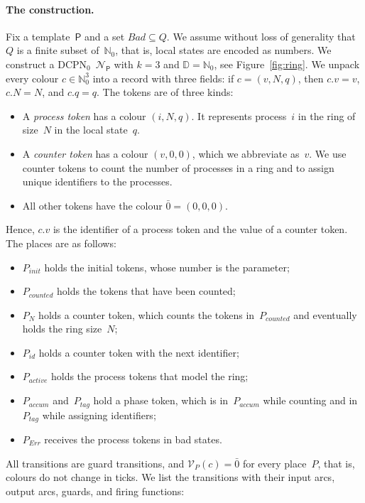 \documentclass[11pt]{article}
\theoremstyle{definition}
\newcommand{\NatZero}{\mathbb{N}_0}
\newcommand{\Dom}{\mathbb{D}}
\newcommand{\DCPN}[1]{\texorpdfstring{\textup{DCPN}\ensuremath{_{#1}}}{DCPN#1}}
\begin{document}
\paragraph{The construction.}
Fix a template~$\mathsf{P}$ and a set $\mathit{Bad} \subseteq Q$. We assume
without loss of generality that $Q$ is a finite subset of~$\NatZero$,
that is, local states are encoded as numbers.
We construct a \DCPN{0}~$\mathcal{N}_{\mathsf{P}}$
with $k = 3$ and $\Dom = \NatZero$, see Figure~\ref{fig:ring}. We unpack every
colour $c \in \NatZero^3$ into a record with three fields: if $c = (v, N, q)$,
then $c.v = v$, $c.N = N$, and $c.q = q$. The tokens are of three kinds:
\begin{itemize}
  \item A \emph{process token} has a colour $(i, N, q)$. It represents
    process~$i$ in the ring of size~$N$ in the local state~$q$.
  \item A \emph{counter token} has a colour $(v, 0, 0)$, which we abbreviate
    as~$v$. We use counter tokens to count the number of processes in a ring
    and to assign unique identifiers to the processes.
  \item All other tokens have the colour $\bar{0} = (0, 0, 0)$.
\end{itemize}
Hence, $c.v$ is the identifier of a process token and the value of a counter
token. The places are as follows:
\begin{itemize}
  \item $P_{\mathit{init}}$ holds the initial tokens, whose number is the
    parameter;
  \item $P_{\mathit{counted}}$ holds the tokens that have been counted;
  \item $P_N$ holds a counter token, which counts the tokens in~$P_{\mathit{counted}}$ and
    eventually holds the ring size~$N$;
  \item $P_{\mathit{id}}$ holds a counter token with the next identifier;
  \item $P_{\mathit{active}}$ holds the process tokens that model the ring;
  \item $P_{\mathit{accum}}$ and~$P_{\mathit{tag}}$ hold a phase token, which
    is in~$P_{\mathit{accum}}$ while counting and in~$P_{\mathit{tag}}$ while
    assigning identifiers;
  \item $P_{\mathit{Err}}$ receives the process tokens in bad states.
\end{itemize}
All transitions are guard transitions, and $\mathcal{V}_P(c) = \bar{0}$ for
every place~$P$, that is, colours do not change in ticks. We list the
transitions with their input arcs, output arcs, guards, and firing functions:
\end{document}
